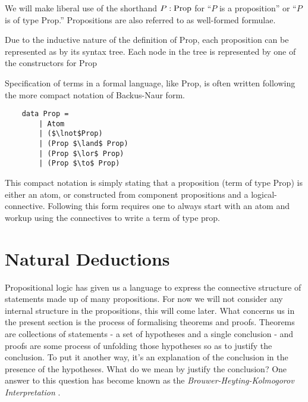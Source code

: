 \documentclass{book}
\begin{document}
We will make liberal use of the shorthand $P : \text{Prop}$ for ``$P$ is a proposition'' or ``$P$ is of type Prop.'' Propositions are also referred to as well-formed formulae. 

Due to the inductive nature of the definition of Prop, each proposition can be represented as by its syntax tree. Each node in the tree is represented by one of the constructors for Prop


\begin{eg}
    
\end{eg}



Specification of terms in a formal language, like Prop, is often written following the more compact notation of Backus-Naur form. 

\begin{lstlisting}
    data Prop =
        | Atom
        | ($\lnot$Prop)
        | (Prop $\land$ Prop)
        | (Prop $\lor$ Prop)
        | (Prop $\to$ Prop)
\end{lstlisting}

This compact notation is simply stating that a proposition (term of type Prop) is either an atom, or constructed from component propositions and a logical-connective. Following this form requires one to always start with an atom and workup using the connectives to write a term of type prop. 


    \newpage
    \section{Natural Deductions}

    Propositional logic has given us a language to express the connective structure of statements made up of many propositions. For now we will not consider any internal structure in the propositions, this will come later. What concerns us in the present section is the process of formalising theorems and proofs. Theorems are collections of statements - a set of hypotheses and a single conclusion - and proofs are some process of unfolding those hypotheses so as to justify the conclusion. To put it another way, it's an explanation of the conclusion in the presence of the hypotheses. What do we mean by justify the conclusion? One answer to this question has become known as the \emph{Brouwer-Heyting-Kolmogorov Interpretation} \cite{sep-mathematics-constructive}.
\end{document}

